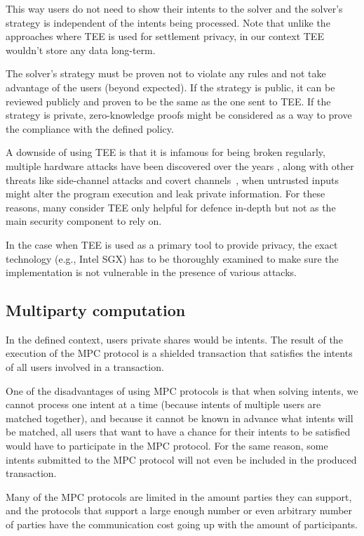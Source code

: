 \documentclass[
    9pt,            %
    report,        %
    affiltop,       %
]{art}
\begin{document}
This way users do not need to show their intents to the solver and the solver's strategy is independent of the intents being processed. Note that unlike the approaches where TEE is used for settlement privacy, in our context TEE wouldn't store any data long-term.

The solver's strategy must be proven not to violate any rules and not take advantage of the users (beyond expected). If the strategy is public, it can be reviewed publicly and proven to be the same as the one sent to TEE. If the strategy is private, zero-knowledge proofs might be considered as a way to prove the compliance with the defined policy.

A downside of using TEE is that it is infamous for being broken regularly,
multiple hardware attacks have been discovered over the years
\citep{sgxfail,downfall}, along with other threats like side-channel attacks and
covert channels~\citep{flash}, when untrusted inputs might alter the program
execution and leak private information. For these reasons, many consider TEE
only helpful for defence in-depth but not as the main security component to rely
on.

In the case when TEE is used as a primary tool to provide privacy, the exact technology
(e.g., Intel SGX) has to be thoroughly examined to make sure the implementation
is not vulnerable in the presence of various attacks.

\subsection{Multiparty computation}

In the defined context, users private shares would be intents. The result of the execution of the MPC protocol is a shielded transaction that satisfies the intents of all users involved in a transaction.

One of the disadvantages of using MPC protocols is that when solving intents, we cannot process one intent at a time (because intents of multiple users are matched together), and because it cannot be known in advance what intents will be matched, all users that want to have a chance for their intents to be satisfied would have to participate in the MPC protocol. For the same reason, some intents submitted to the MPC protocol will not even be included in the produced transaction.

Many of the MPC protocols are limited in the amount parties they can support, and the protocols that support a large enough number or even arbitrary number of parties have the communication cost going up with the amount of participants.
\end{document}
